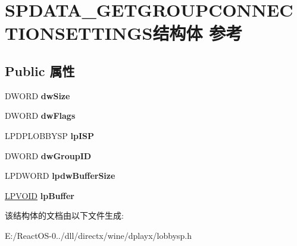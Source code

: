 \hypertarget{struct_s_p_d_a_t_a___g_e_t_g_r_o_u_p_c_o_n_n_e_c_t_i_o_n_s_e_t_t_i_n_g_s}{}\section{S\+P\+D\+A\+T\+A\+\_\+\+G\+E\+T\+G\+R\+O\+U\+P\+C\+O\+N\+N\+E\+C\+T\+I\+O\+N\+S\+E\+T\+T\+I\+N\+G\+S结构体 参考}
\label{struct_s_p_d_a_t_a___g_e_t_g_r_o_u_p_c_o_n_n_e_c_t_i_o_n_s_e_t_t_i_n_g_s}
\subsection*{Public 属性}
\begin{DoxyCompactItemize}
\item 
\mbox{\label{struct_s_p_d_a_t_a___g_e_t_g_r_o_u_p_c_o_n_n_e_c_t_i_o_n_s_e_t_t_i_n_g_s_ab586a996bfe527a0f445fc66cdeea79d}} 
D\+W\+O\+RD {\bfseries dw\+Size}
\item 
\mbox{\label{struct_s_p_d_a_t_a___g_e_t_g_r_o_u_p_c_o_n_n_e_c_t_i_o_n_s_e_t_t_i_n_g_s_a1f1194d25997aceed7e87e4708614b19}} 
D\+W\+O\+RD {\bfseries dw\+Flags}
\item 
\mbox{\label{struct_s_p_d_a_t_a___g_e_t_g_r_o_u_p_c_o_n_n_e_c_t_i_o_n_s_e_t_t_i_n_g_s_af2c22b5b97796e26f98c36dae8cf2417}} 
L\+P\+D\+P\+L\+O\+B\+B\+Y\+SP {\bfseries lp\+I\+SP}
\item 
\mbox{\label{struct_s_p_d_a_t_a___g_e_t_g_r_o_u_p_c_o_n_n_e_c_t_i_o_n_s_e_t_t_i_n_g_s_a5baf6a9bb8c2106408ca4b17b3aeb621}} 
D\+W\+O\+RD {\bfseries dw\+Group\+ID}
\item 
\mbox{\label{struct_s_p_d_a_t_a___g_e_t_g_r_o_u_p_c_o_n_n_e_c_t_i_o_n_s_e_t_t_i_n_g_s_a58c302c0aac14a793800b39bd9a65833}} 
L\+P\+D\+W\+O\+RD {\bfseries lpdw\+Buffer\+Size}
\item 
\mbox{\label{struct_s_p_d_a_t_a___g_e_t_g_r_o_u_p_c_o_n_n_e_c_t_i_o_n_s_e_t_t_i_n_g_s_a7e104aeebfe588b79ab72eaf5be031c4}} 
\hyperlink{interfacevoid}{L\+P\+V\+O\+ID} {\bfseries lp\+Buffer}
\end{DoxyCompactItemize}


该结构体的文档由以下文件生成\+:\begin{DoxyCompactItemize}
\item 
E\+:/\+React\+O\+S-\/0../dll/directx/wine/dplayx/lobbysp.\+h\end{DoxyCompactItemize}
